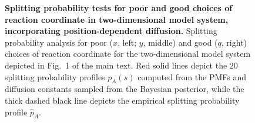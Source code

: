 \documentclass[aps,prl,twocolumn,superscriptaddress,floatfix]{revtex4-1}
\begin{document}
\begin{figure}[tbp]
\caption{{\bf Splitting probability tests for poor and good choices of reaction coordinate in two-dimensional model system, incorporating position-dependent diffusion.}
Splitting probability analysis for poor ($x$, left; $y$, middle) and good ($q$, right) choices of reaction coordinate for the two-dimensional model system depicted in Fig.~1 of the main text.
Red solid lines depict the 20 splitting probability profiles $p_A(s)$ computed from the PMFs and diffusion constants sampled from the Bayesian posterior, while the thick dashed black line depicts the empirical splitting probability profile $\hat{p}_A$.
}
\label{figure:coordinate-dependent-diffusion-model}
\end{figure}
\end{document}
